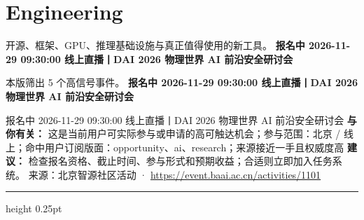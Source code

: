 \documentclass[10.5pt]{ctexart}
\begin{document}
\section*{Engineering}
{\color{ormuted} 开源、框架、GPU、推理基础设施与真正值得使用的新工具。}
\vspace{2mm}
{\LARGE\bfseries 报名中 2026-11-29 09:30:00 线上直播丨DAI 2026 物理世界 AI 前沿安全研讨会}\par
\vspace{1mm}
{\color{ormuted} 本版筛出 5 个高信号事件。}
\vspace{3mm}
{\Large\bfseries 报名中 2026-11-29 09:30:00 线上直播丨DAI 2026 物理世界 AI 前沿安全研讨会}\par
报名中 2026-11-29 09:30:00 线上直播丨DAI 2026 物理世界 AI 前沿安全研讨会
\textbf{与你有关：} 这是当前用户可实际参与或申请的高可触达机会；参与范围：北京 / 线上；命中用户订阅版面：opportunity、ai、research；来源接近一手且权威度高
\textbf{建议：} 检查报名资格、截止时间、参与形式和预期收益；合适则立即加入任务系统。
{\footnotesize\color{ormuted} 来源：北京智源社区活动 · \url{https://event.baai.ac.cn/activities/1101}}
\vspace{4mm}
\hrule height 0.25pt
\vspace{3mm}
\end{document}
